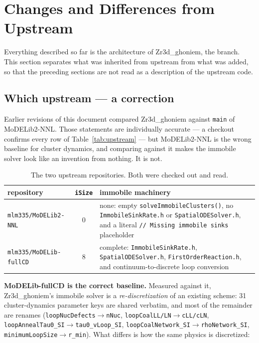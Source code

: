 \documentclass[11pt]{article}
\newcommand{\MoDfull}{\textsf{MoDELib-fullCD}}
\newcommand{\MoDnnl}{\textsf{MoDELib2-NNL}}
\newcommand{\Zrd}{\textsf{Zr3d\_ghoniem}}
\newcommand{\code}[1]{\texttt{\small #1}}
\newcommand{\file}[1]{\texttt{\footnotesize #1}}
\begin{document}
\section{Changes and Differences from Upstream}
\label{sec:changes}

Everything described so far is the architecture of \Zrd{}, the branch. This
section separates what was inherited from upstream from what was added, so
that the preceding sections are not read as a description of the upstream code.

\subsection{Which upstream --- a correction}
\label{sec:whichupstream}

Earlier revisions of this document compared \Zrd{} against \file{main} of
\MoDnnl{}. Those statements are individually accurate --- a checkout confirms
every row of Table~\ref{tab:upstream} --- but \MoDnnl{} is the wrong baseline
for cluster dynamics, and comparing against it makes the immobile solver look
like an invention from nothing. It is not.

\begin{table}[htbp]
\centering
\caption{The two upstream repositories. Both were checked out and read.}
\label{tab:twoupstream}
\begin{tabular}{@{}lcp{}@{}}
\toprule
repository & \code{iSize} & immobile machinery \\
\midrule
\file{mlm335/MoDELib2-NNL}  & 0 &
  none: empty \code{solveImmobileClusters()}, no \file{ImmobileSinkRate.h} or
  \file{SpatialODESolver.h}, and a literal \code{// Missing immobile sinks}
  placeholder \\
\file{mlm335/MoDELib-fullCD} & 8 &
  complete: \file{ImmobileSinkRate.h}, \file{SpatialODESolver.h},
  \file{FirstOrderReaction.h}, and continuum-to-discrete loop conversion \\
\bottomrule
\end{tabular}
\end{table}

\noindent
\textbf{\MoDfull{} is the correct baseline.} Measured against it, \Zrd{}'s
immobile solver is a \emph{re-discretization} of an existing scheme: 31
cluster-dynamics parameter keys are shared verbatim, and most of the remainder
are renames (\code{loopNucDefects}$\to$\code{nNuc},
\code{loopCoalLL/LN}$\to$\code{cLL/cLN},
\code{loopAnnealTau0\_SI}$\to$\code{tau0\_vLoop\_SI},
\code{loopCoalNetwork\_SI}$\to$\code{rhoNetwork\_SI},
\code{minimumLoopSize}$\to$\code{r\_min}). What differs is how the same physics
is discretized:
\end{document}
